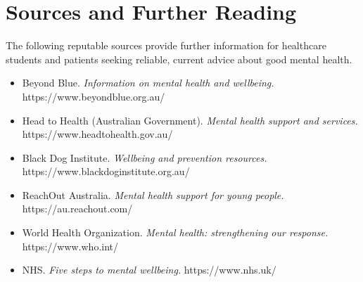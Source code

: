 \section*{Sources and Further Reading}
The following reputable sources provide further information for healthcare students and patients seeking reliable, current advice about good mental health.

\begin{itemize}
    \item Beyond Blue. \textit{Information on mental health and wellbeing.} https://www.beyondblue.org.au/
    \item Head to Health (Australian Government). \textit{Mental health support and services.} https://www.headtohealth.gov.au/
    \item Black Dog Institute. \textit{Wellbeing and prevention resources.} https://www.blackdoginstitute.org.au/
    \item ReachOut Australia. \textit{Mental health support for young people.} https://au.reachout.com/
    \item World Health Organization. \textit{Mental health: strengthening our response.} https://www.who.int/
    \item NHS. \textit{Five steps to mental wellbeing.} https://www.nhs.uk/
\end{itemize}
